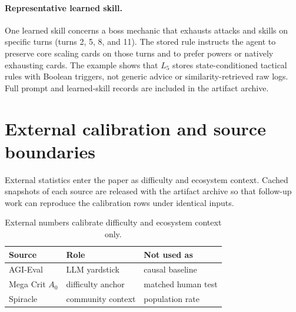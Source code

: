 \paragraph{Representative learned skill.}
One learned skill concerns a boss mechanic that exhausts attacks and
skills on specific turns (turns 2, 5, 8, and 11). The stored rule
instructs the agent to preserve core scaling cards on those turns and
to prefer powers or natively exhausting cards. The example shows that
$L_5$ stores state-conditioned tactical rules with Boolean triggers,
not generic advice or similarity-retrieved raw logs. Full prompt and
learned-skill records are included in the artifact archive.

\section{External calibration and source boundaries}
\label{app:difficulty-calibration}

External \stspad{} statistics enter the paper as difficulty and
ecosystem context. Cached snapshots of each source are released
with the artifact archive so that follow-up work can reproduce
the calibration rows under identical inputs.

\begin{table}[H]
\centering\footnotesize
\caption{External numbers calibrate difficulty and ecosystem context only.}
\label{tab:difficulty-calibration}
\setlength{\tabcolsep}{4pt}
\renewcommand{\arraystretch}{1.08}
\begin{tabular*}{\columnwidth}{@{\extracolsep{\fill}}lll@{}}
\toprule
Source & Role & Not used as \\
\midrule
AGI-Eval & LLM yardstick & causal baseline \\
Mega Crit $A_0$ & difficulty anchor & matched human test \\
Spiracle & community context & population rate \\
\bottomrule
\end{tabular*}
\end{table}
\FloatBarrier

